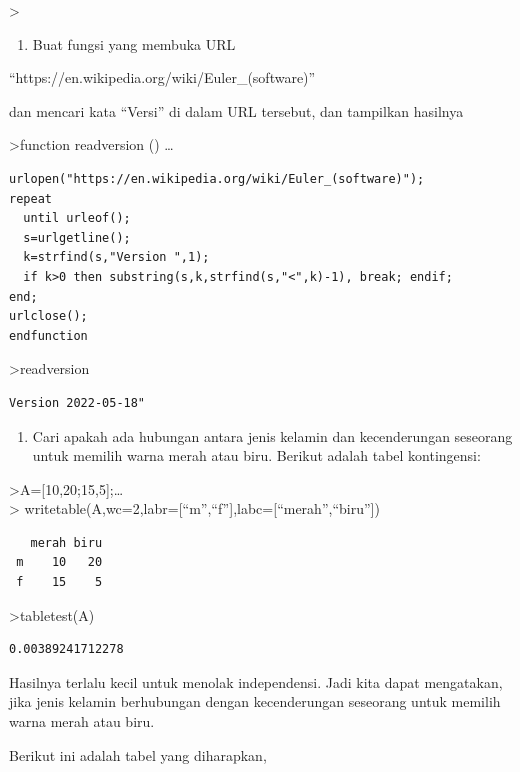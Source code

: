 \documentclass[
]{book}
\providecommand{\tightlist}{%
  \setlength{\itemsep}{0pt}\setlength{\parskip}{0pt}}
\begin{document}
\textgreater{}

\begin{enumerate}
\def\labelenumi{\arabic{enumi}.}
\setcounter{enumi}{3}
\tightlist
\item
  Buat fungsi yang membuka URL
\end{enumerate}

``https://en.wikipedia.org/wiki/Euler\_(software)''

dan mencari kata ``Versi'' di dalam URL tersebut, dan tampilkan hasilnya

\textgreater function readversion () \ldots{}

\begin{verbatim}
urlopen("https://en.wikipedia.org/wiki/Euler_(software)");
repeat
  until urleof();
  s=urlgetline();
  k=strfind(s,"Version ",1);
  if k>0 then substring(s,k,strfind(s,"<",k)-1), break; endif;
end;
urlclose();
endfunction
\end{verbatim}

\textgreater readversion

\begin{verbatim}
Version 2022-05-18"
\end{verbatim}

\begin{enumerate}
\def\labelenumi{\arabic{enumi}.}
\setcounter{enumi}{4}
\tightlist
\item
  Cari apakah ada hubungan antara jenis kelamin dan kecenderungan seseorang untuk memilih warna merah atau biru. Berikut adalah tabel kontingensi:
\end{enumerate}

\textgreater A={[}10,20;15,5{]};\ldots{}\\
\textgreater{} writetable(A,wc=2,labr={[}``m'',``f''{]},labc={[}``merah'',``biru''{]})

\begin{verbatim}
   merah biru
 m    10   20
 f    15    5
\end{verbatim}

\textgreater tabletest(A)

\begin{verbatim}
0.00389241712278
\end{verbatim}

Hasilnya terlalu kecil untuk menolak independensi. Jadi kita dapat mengatakan, jika jenis kelamin berhubungan dengan kecenderungan seseorang untuk memilih warna merah atau biru.

Berikut ini adalah tabel yang diharapkan,
\end{document}
